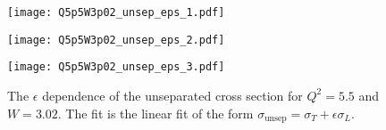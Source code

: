 \begin{figure}
  \centering
  \begin{minipage}[b]{0.48\linewidth}
    \texttt{[image: Q5p5W3p02\_unsep\_eps\_1.pdf]}
  \end{minipage}
  \hfill
  \begin{minipage}[b]{0.48\linewidth}
    \texttt{[image: Q5p5W3p02\_unsep\_eps\_2.pdf]}
  \end{minipage}
  \begin{minipage}[b]{0.48\linewidth}
    \texttt{[image: Q5p5W3p02\_unsep\_eps\_3.pdf]}
  \end{minipage}
  \caption{The $\epsilon$ dependence of the unseparated cross section for $Q^2=5.5$ and $W=3.02$. The fit is the linear fit of the form $\sigma_{\mathrm{unsep}}=\sigma_T+\epsilon\sigma_L$.}
  \label{fig:Q5p5W3p02_unsep_eps}
\end{figure}

